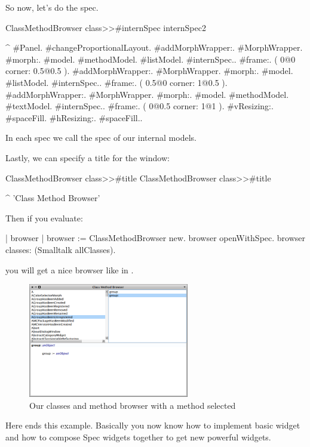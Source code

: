\documentclass[a4paper,10pt,twoside]{book}
\begin{document}
So now, let's do the spec. 
\begin{method}{ClassMethodBrowser class>>\#internSpec}
internSpec2

	^ { #Panel.
			#changeProportionalLayout.
			#addMorphWrapper:.	
				{	#MorphWrapper.
									#morph:. 	{#model. #methodModel. #listModel. #internSpec.}.
									#frame:. 	( 0@0 corner: 0.5@0.5 )}.
			#addMorphWrapper:.	
				{	#MorphWrapper.
									#morph:. 	{#model. #listModel. #internSpec.}.
									#frame:. 	( 0.5@0 corner: 1@0.5 )}.
			#addMorphWrapper:.	
				{	#MorphWrapper.
									#morph:. 	{#model. #methodModel. #textModel. #internSpec.}.
									#frame:.	( 0@0.5 corner: 1@1 )}.
			#vResizing:. #spaceFill.
			#hResizing:. #spaceFill.}.
\end{method}
In each spec we call the spec of our internal models.

Lastly, we can specify a title for the window:
\begin{method}{ClassMethodBrowser class>>\#title}
ClassMethodBrowser class>>#title

	^ 'Class Method Browser'
\end{method}

Then if you evaluate:

\begin{code}{}
| browser |
browser := ClassMethodBrowser new.
browser openWithSpec.
browser classes: (Smalltalk allClasses).
\end{code}

you will get a nice browser like in .


\begin{figure}[ht]
\begin{center}
	\includegraphics[width=7cm]{MethodBrowser6}
	\caption{Our classes and method browser with a method selected}
\end{center}
\end{figure}


Here ends this example. 
Basically you now know how to implement basic widget and how to compose Spec widgets together to get new powerful widgets.
\end{document}
